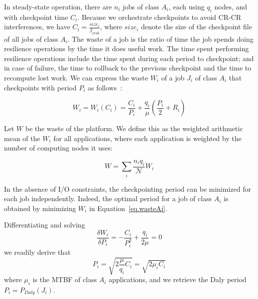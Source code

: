 \documentclass[two]{article}
\newcommand{\bandavail}{\beta_{\text{avail}}}
\newcommand{\nbnodesplat}{{\mathcal N}}
\newcommand{\app}[1]{A_{#1}}
\newcommand{\nbapp}[1]{n_{#1}}
\newcommand{\nbnodes}[1]{q_{#1}}
\newcommand{\period}[1]{P_{#1}}
\newcommand{\ckpt}[1]{C_{#1}}
\newcommand{\reco}[1]{R_{#1}}
\newcommand{\size}[1]{\mathit{size}_{#1}}
\newcommand{\wasteapp}[1]{W_{#1}}
\newcommand{\mtbfplat}{\mu}
\newcommand{\wasteplat}{W}
\newcommand{\wastefct}[2]{W_{#1}(#2)}
\begin{document}
In steady-state operation, there are $\nbapp{i}$ jobs of class $\app{i}$, each
using $\nbnodes{i}$ nodes, and with checkpoint time $\ckpt{i}$. Because we
orchestrate checkpoints to avoid CR-CR interferences, we have $\ckpt{i} =
\frac{\size{i}}{\bandavail}$, where $\size{i}$ denote the size of the
checkpoint file of all jobs of class $\app{i}$.  The waste of a job is the
ratio of time the job spends doing resilience operations by the time it does
useful work. The time spent performing resilience operations include the time spent
during each period to checkpoint; and in case of failure, the time to rollback
to the previous checkpoint and the time to recompute lost work.
We can express the waste $\wasteapp{i}$ of a job $J_{i}$ of class $\app{i}$
that checkpoints with period $\period{i}$ as follows~\cite{springer-monograph}:

\begin{equation}
\wasteapp{i} = \wastefct{i}{\ckpt{i}} = \frac{\ckpt{i}}{\period{i}} +
\frac{\nbnodes{i}}{\mtbfplat}(\frac{\period{i}}{2} + \reco{i})
\label{eq.wasteAi}
\end{equation}

Let $\wasteplat$ be the waste of the platform. We define this as the
weighted arithmetic mean of the $\wasteapp{i}$ for all applications,
where each application is weighted by the number of computing nodes
it uses:

\begin{equation}
\wasteplat = \sum_i \frac{\nbapp{i} \nbnodes{i}}{\nbnodesplat} \wasteapp{i}
\label{eq.waste}
\end{equation}

In the absence of I/O constraints, the checkpointing period can be minimized
for each job independently. Indeed, the optimal period for a job
of class $\app{i}$ is obtained by minimizing $\wasteapp{i}$ in 
Equation~\eqref{eq.wasteAi}.

Differentiating and solving
$$\frac{\delta \wasteapp{i}}{\delta \period{i}} = - \frac{\ckpt{i}}{\period{i}^{2}} + \frac{\nbnodes{i}}{2 \mtbfplat} = 0$$
we readily derive that
\begin{equation}
\period{i} = \sqrt{2 \frac{\mtbfplat}{\nbnodes{i}} \ckpt{i}} = \sqrt{2 \mu_{i} \ckpt{i}}
\label{eq.daly}
\end{equation}
where $\mu_{i}$ is the MTBF of  class $\app{i}$ applications, and we retrieve the Daly period
$\period{i} = \period{Daly}(J_{i})$.
\end{document}
